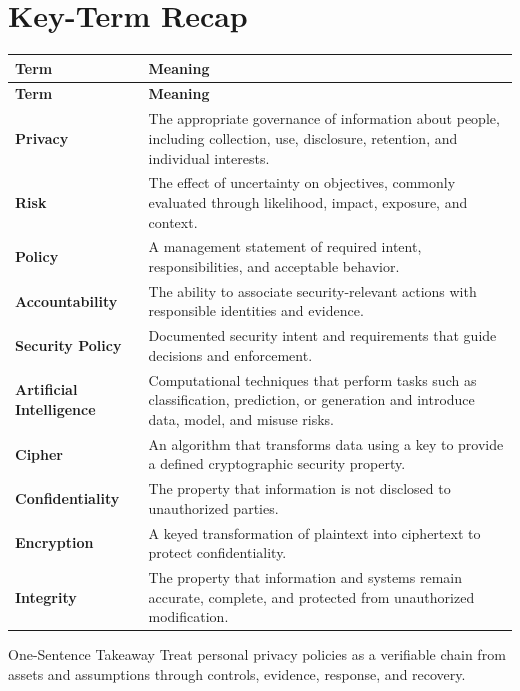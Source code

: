 \documentclass[11pt,letterpaper]{article}
\begin{document}
\section*{Key-Term Recap}
\begin{longtable}{>{\raggedright\arraybackslash}p{}>{\raggedright\arraybackslash}p{}}
\toprule\rowcolor{Navy}\color{white}\textbf{Term} & \color{white}\textbf{Meaning}\\\midrule
\endfirsthead
\toprule\rowcolor{Navy}\color{white}\textbf{Term} & \color{white}\textbf{Meaning}\\\midrule
\endhead
\textbf{Privacy} & The appropriate governance of information about people, including collection, use, disclosure, retention, and individual interests. \\\midrule
\textbf{Risk} & The effect of uncertainty on objectives, commonly evaluated through likelihood, impact, exposure, and context. \\\midrule
\textbf{Policy} & A management statement of required intent, responsibilities, and acceptable behavior. \\\midrule
\textbf{Accountability} & The ability to associate security-relevant actions with responsible identities and evidence. \\\midrule
\textbf{Security Policy} & Documented security intent and requirements that guide decisions and enforcement. \\\midrule
\textbf{Artificial Intelligence} & Computational techniques that perform tasks such as classification, prediction, or generation and introduce data, model, and misuse risks. \\\midrule
\textbf{Cipher} & An algorithm that transforms data using a key to provide a defined cryptographic security property. \\\midrule
\textbf{Confidentiality} & The property that information is not disclosed to unauthorized parties. \\\midrule
\textbf{Encryption} & A keyed transformation of plaintext into ciphertext to protect confidentiality. \\\midrule
\textbf{Integrity} & The property that information and systems remain accurate, complete, and protected from unauthorized modification. \\\midrule
\bottomrule
\end{longtable}
\begin{CornellExamBox}{One-Sentence Takeaway}
Treat personal privacy policies as a verifiable chain from assets and assumptions through controls, evidence, response, and recovery.
\end{CornellExamBox}
\end{document}
